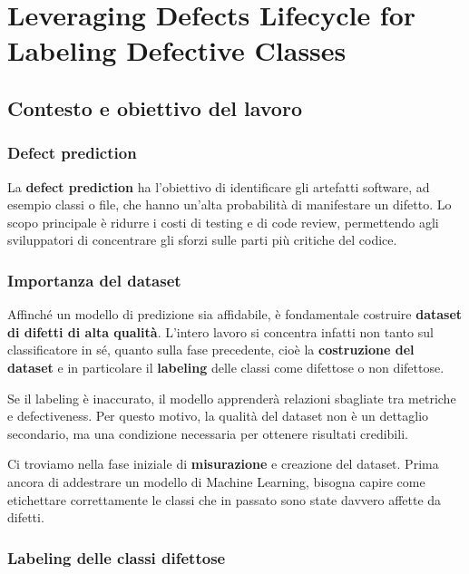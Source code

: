 \chapter{Leveraging Defects Lifecycle for Labeling Defective Classes}

\section{Contesto e obiettivo del lavoro}

\subsection{Defect prediction}

La \textbf{defect prediction} ha l'obiettivo di identificare gli artefatti software, ad esempio classi o file, che hanno un'alta probabilità di manifestare un difetto. Lo scopo principale è ridurre i costi di testing e di code review, permettendo agli sviluppatori di concentrare gli sforzi sulle parti più critiche del codice.

\subsection{Importanza del dataset}

Affinché un modello di predizione sia affidabile, è fondamentale costruire \textbf{dataset di difetti di alta qualità}. L'intero lavoro si concentra infatti non tanto sul classificatore in sé, quanto sulla fase precedente, cioè la \textbf{costruzione del dataset} e in particolare il \textbf{labeling} delle classi come difettose o non difettose.

Se il labeling è inaccurato, il modello apprenderà relazioni sbagliate tra metriche e defectiveness. Per questo motivo, la qualità del dataset non è un dettaglio secondario, ma una condizione necessaria per ottenere risultati credibili.

\begin{notaprof}
Ci troviamo nella fase iniziale di \textbf{misurazione} e creazione del dataset. Prima ancora di addestrare un modello di Machine Learning, bisogna capire come etichettare correttamente le classi che in passato sono state davvero affette da difetti.
\end{notaprof}

\subsection{Labeling delle classi difettose}


